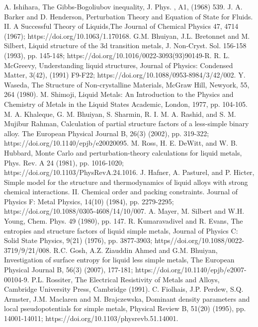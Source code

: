 \documentclass[final,12pt]{elsarticle}
\begin{document}
{\begin{thebibliography}{thesis}
	A. Ishihara, The Gibbs-Bogoliubov inequality, J. Phys. , A1, (1968) 539.
	J. A. Barker and D. Henderson, Perturbation Theory and Equation of State for Fluids. II. A Successful Theory of Liquids,The Journal of Chemical Physics 47, 4714 (1967); https://doi.org/10.1063/1.170168.
	G.M. Bhuiyan, J.L. Bretonnet and M. Silbert, Liquid structure of the 3d transition metals, J. Non-Cryst. Sol. 156-158 (1993), pp. 145-148; https://doi.org/10.1016/0022-3093(93)90149-R.
	R. L. McGreevy, Understanding liquid structures, Journal of Physics: Condensed Matter, 3(42), (1991) F9-F22; https://doi.org/10.1088/0953-8984/3/42/002.
	Y. Waseda, The Structure of Non-crystalline Materials, McGraw Hill, Newyork, 55, 264 (1980).
	 M. Shimoji, Liquid Metals: An Introduction to the Physics and Chemistry of Metals in the Liquid States Academic, London, 1977, pp. 104-105.
	M. A. Khaleque, G. M. Bhuiyan, S. Sharmin, R. I. M. A. Rashid, and S. M. Mujibur Rahman, Calculation of partial structure factors of a less-simple binary alloy. The European Physical Journal B, 26(3) (2002), pp. 319-322; https://doi.org/10.1140/epjb/e20020095.
	M. Ross, H. E. DeWitt, and W. B. Hubbard, Monte Carlo and perturbation-theory calculations for liquid metals, Phys. Rev. A 24 (1981), pp. 1016-1020; https://doi.org/10.1103/PhysRevA.24.1016.
	J. Hafner, A. Pasturel, and P. Hicter, Simple model for the structure and thermodynamics of liquid alloys with strong chemical interactions. II. Chemical order and packing constraints. Journal of Physics F: Metal Physics, 14(10) (1984), pp. 2279-2295; https://doi.org/10.1088/0305-4608/14/10/007.
	A. Mayer, M. Silbert and W.H. Young, Chem. Phys. 49 (1980), pp. 147.
	R. Kumaravadivel and R. Evans, The entropies and structure factors of liquid simple metals, Journal of Physics C: Solid State Physics, 9(21) (1976), pp. 3877-3903; https//doi.org/10.1088/0022-3719/9/21/008.
	R.C. Gosh, A.Z. Ziauddin Ahmed and G.M. Bhuiyan, Investigation of surface entropy for liquid less simple metals, The European Physical Journal B, 56(3) (2007), 177-181; https://doi.org/10.1140/epjb/e2007-00104-9.
	P.L. Rossiter, The Electrical Resistivity of Metals and Alloys, Cambridge University Press, Cambridge (1991).
	C. Fiolhais, J.P. Perdew, S.Q. Armster, J.M. Maclaren and M. Brajczewska, Dominant density parameters and local pseudopotentials for simple metals, Physical Review B, 51(20) (1995), pp. 14001-14011; https://doi.org/10.1103/physrevb.51.14001.

\end{thebibliography}}
\end{document}
